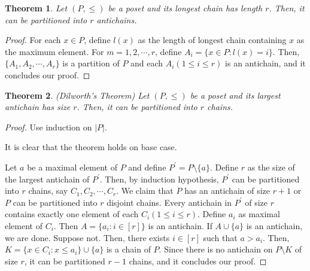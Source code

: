 \documentclass[11pt]{article}
\newtheorem{theorem}{Theorem}
\theoremstyle{definition}
\begin{document}
	\begin{theorem}
		Let $(P, \leq)$ be a poset and its longest chain has length $r$.
		Then, it can be partitioned into $r$ antichains.
	\end{theorem}
	
	\begin{proof}
		For each $x \in P$, define $l(x)$ as the length of longest chain containing $x$ as the maximum element. 
		For $m = 1, 2, \cdots , r$, define $A_i = \{ x \in P : l(x) = i \}$. 
		Then, $\{A_1, A_2, \cdots, A_r \}$ is a partition of $P$ and each $A_i(1\leq i \leq r)$ is an antichain, and it concludes our proof.
	\end{proof}

	\begin{theorem}(Dilworth's Theorem)
		Let $(P, \leq)$ be a poset and its largest antichain has size $r$. Then, it can be partitioned into $r$ chains.
	\end{theorem}

	\begin{proof}
		Use induction on $|P|$.
		
		It is clear that the theorem holds on base case.
		
		Let $a$ be a maximal element of $P$ and define $P^{\prime} = P \setminus \{a\}$.
		Define $r$ as the size of the largest antichain of $P^{\prime}$.
		Then, by induction hypothesis, $P^{\prime}$ can be partitioned into $r$ chains, say $C_1, C_2, \cdots, C_r$.
		We claim that $P$ has an antichain of size $r+1$ or $P$ can be partitioned into $r$ disjoint chains.
		Every antichain in $P^{\prime}$ of size $r$ contains exactly one element of each $C_i(1 \leq i \leq r)$.
		Define $a_i$ as maximal element of $C_i$.
		Then $A = \{a_i : i \in [r] \}$ is an antichain.
		If $A \cup \{a\}$ is an antichain, we are done.
		Suppose not.
		Then, there exists $i \in [r]$ such that $a > a_i$.
		Then, $K = \{x \in C_i : x \leq a_i \} \cup \{a\}$ is a chain of $P$.
		Since there is no antichain on $P \setminus K$ of size $r$, it can be partitioned $r-1$ chains, and it concludes our proof.
	\end{proof}
	
\end{document}
